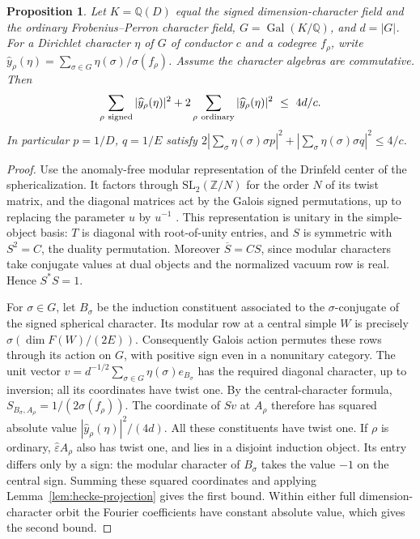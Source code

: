 \documentclass[11pt,a4paper]{article}
\newtheorem{proposition}[theorem]{Proposition}
\numberwithin{equation}{section}
\begin{document}
\begin{proposition}\label{prop:induction-fourier}
Let $K=\mathbb Q(D)$ equal the signed dimension-character field and the
ordinary Frobenius--Perron character field, $G=\operatorname{Gal}(K/\mathbb Q)$,
and $d=|G|$. For a Dirichlet character $\eta$ of $G$ of conductor $c$ and
a codegree $f_\rho$, write
$\widehat y_{\rho}(\eta)=\sum_{\sigma\in G}\eta(\sigma)/\sigma(f_\rho)$.
Assume the character algebras are commutative. Then
\[
  \sum_{\rho\ {\rm signed}}|\widehat y_{\rho}(\eta)|^2
   +2\sum_{\rho\ {\rm ordinary}}|\widehat y_{\rho}(\eta)|^2
  \ \le\ 4d/c .
\]
In particular $p=1/D$, $q=1/E$ satisfy
$2|\sum_\sigma\eta(\sigma)\sigma p|^2+
 |\sum_\sigma\eta(\sigma)\sigma q|^2\le 4/c$.
\end{proposition}
\begin{proof}
Use the anomaly-free modular representation of the Drinfeld center of the
sphericalization. It factors through $\mathrm{SL}_2(\mathbb Z/N)$ for
the order $N$ of its twist matrix, and the diagonal matrices act by the
Galois signed permutations, up to replacing the parameter $u$ by $u^{-1}$
\cite[Theorem II and Remark 4.5]{DLN}. This representation is unitary in the simple-object basis:
$T$ is diagonal with root-of-unity entries, and $S$ is symmetric with
$S^2=C$, the duality permutation. Moreover $\overline{S}=CS$, since
modular characters take conjugate values at dual objects and the
normalized vacuum row is real. Hence $S^*S=1$.

For $\sigma\in G$, let $B_\sigma$ be the induction constituent associated
to the $\sigma$-conjugate of the signed spherical character. Its modular
row at a central simple $W$ is precisely
$\sigma(\dim F(W)/(2E))$. Consequently Galois action permutes these rows
through its action on $G$, with positive sign even in a nonunitary
category. The unit vector
$v=d^{-1/2}\sum_{\sigma\in G}\eta(\sigma)e_{B_\sigma}$ has the required
diagonal character, up to inversion; all its coordinates have twist one.
By the central-character formula,
$S_{B_\sigma,A_\rho}=1/(2\sigma(f_\rho))$. The coordinate of $Sv$ at
$A_\rho$ therefore has squared absolute value
$|\widehat y_{\rho}(\eta)|^2/(4d)$. All these constituents have twist
one. If $\rho$ is ordinary, $\widehat\varepsilon A_\rho$ also has twist
one, and lies in a disjoint induction object. Its entry differs only by
a sign: the modular character of $B_\sigma$ takes the value $-1$ on the
central sign. Summing these squared coordinates and applying
Lemma~\ref{lem:hecke-projection} gives the first bound. Within either
full dimension-character orbit the Fourier coefficients have constant
absolute value, which gives the second bound.
\end{proof}
\end{document}
